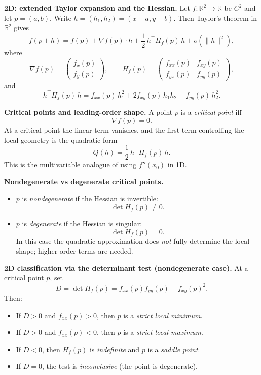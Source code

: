 \documentclass[12pt,a4paper]{article}
\theoremstyle{plain}
\theoremstyle{definition}      %
\begin{document}
	\bigskip
	\noindent\textbf{2D: extended Taylor expansion and the Hessian.}
	Let $f:\mathbb{R}^2\to\mathbb{R}$ be $C^2$ and let $p=(a,b)$.
	Write $h=(h_1,h_2)=(x-a,y-b)$. Then Taylor's theorem in $\mathbb{R}^2$ gives
	\[
	f(p+h)
	=
	f(p)
	+
	\nabla f(p)\cdot h
	+
	\frac12\, h^\top H_f(p)\, h
	+
	o\!\left(\|h\|^2\right),
	\]
	where
	\[
	\nabla f(p)=
	\begin{pmatrix}
		f_x(p)\\[2pt]
		f_y(p)
	\end{pmatrix},
	\qquad
	H_f(p)=
	\begin{pmatrix}
		f_{xx}(p) & f_{xy}(p)\\[2pt]
		f_{yx}(p) & f_{yy}(p)
	\end{pmatrix},
	\]
	and
	\[
	h^\top H_f(p)\,h
	=
	f_{xx}(p)\,h_1^2 + 2f_{xy}(p)\,h_1h_2 + f_{yy}(p)\,h_2^2.
	\]
	
	\medskip
	\noindent\textbf{Critical points and leading-order shape.}
	A point $p$ is a \emph{critical point} iff
	\[
	\nabla f(p)=0.
	\]
	At a critical point the linear term vanishes, and the first term controlling the local geometry is the quadratic form
	\[
	Q(h)=\frac12\, h^\top H_f(p)\,h.
	\]
	This is the multivariable analogue of using $f''(x_0)$ in 1D.
	
	\medskip
	\noindent\textbf{Nondegenerate vs degenerate critical points.}
	\begin{itemize}
		\item $p$ is \emph{nondegenerate} if the Hessian is invertible:
		\[
		\det H_f(p)\neq 0.
		\]
		\item $p$ is \emph{degenerate} if the Hessian is singular:
		\[
		\det H_f(p)=0.
		\]
		In this case the quadratic approximation does \emph{not} fully determine the local shape; higher-order terms are needed.
	\end{itemize}
	
	\medskip
	\noindent\textbf{2D classification via the determinant test (nondegenerate case).}
	At a critical point $p$, set
	\[
	D=\det H_f(p)=f_{xx}(p)f_{yy}(p)-f_{xy}(p)^2.
	\]
	Then:
	\begin{itemize}
		\item If $D>0$ and $f_{xx}(p)>0$, then $p$ is a \emph{strict local minimum}.
		\item If $D>0$ and $f_{xx}(p)<0$, then $p$ is a \emph{strict local maximum}.
		\item If $D<0$, then $H_f(p)$ is \emph{indefinite} and $p$ is a \emph{saddle point}.
		\item If $D=0$, the test is \emph{inconclusive} (the point is degenerate).
	\end{itemize}
	
\end{document}
